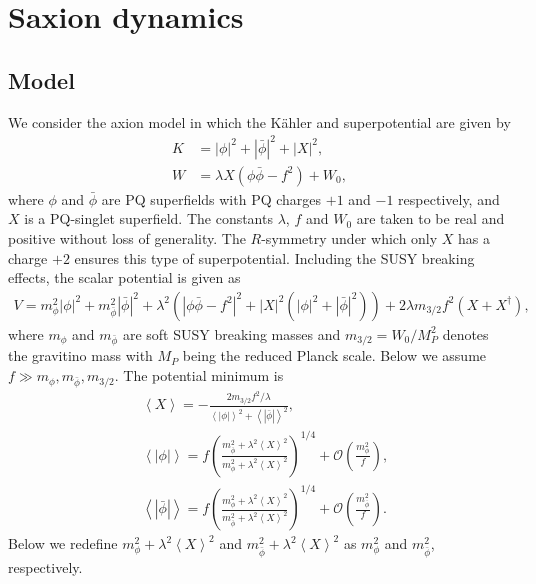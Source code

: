 \documentclass[12pt, a4paper]{article}
\begin{document}
\section{Saxion dynamics}
\label{sec:saxion}
\setcounter{equation}{0}


\subsection{Model}


We consider the axion model in which the K\"ahler and superpotential are given by
\begin{align}
	K &= |\phi|^2 + |\bar\phi|^2 +|X|^2,\\
	W& = \lambda X(\phi\bar\phi - f^2) + W_0,  \label{super}
\end{align}
where $\phi$ and $\bar\phi$ are PQ superfields with PQ charges $+1$ and $-1$ respectively, 
and $X$ is a PQ-singlet superfield.
The constants $\lambda$, $f$ and $W_0$ are taken to be real and positive without loss of generality.
The $R$-symmetry under which only $X$ has a charge $+2$ ensures this type of superpotential.
Including the SUSY breaking effects, the scalar potential is given as
\begin{align}
	V = m_\phi^2|\phi|^2 + m_{\bar\phi}^2|\bar\phi|^2 + \lambda^2\left(\left|\phi\bar\phi - f^2\right|^2+|X|^2(|\phi|^2+|\bar\phi|^2)\right) + 2\lambda m_{3/2}f^2(X+X^\dagger),
\end{align}
where $m_\phi$ and $m_{\bar\phi}$ are soft SUSY breaking masses and $m_{3/2} = W_0/M_P^2$ denotes the gravitino mass with 
$M_P$ being the reduced Planck scale.
Below we assume $f\gg m_\phi, m_{\bar\phi}, m_{3/2}$.
The potential minimum is
\begin{align}
	&\left<X\right> = -\frac{2m_{3/2}f^2/\lambda}{\left<|\phi|\right>^2+\left<|\bar\phi|\right>^2},\\
	&\left<|\phi|\right> = f \left( \frac{m_{\bar\phi}^2 + \lambda^2\left< X\right>^2}{m_{\phi}^2 + \lambda^2\left< X\right>^2}\right)^{1/4} 
	+ \mathcal O\left(\frac{m_\phi^2}{f}\right),\\
	&\left<|\bar\phi|\right> = f \left( \frac{m_{\phi}^2 + \lambda^2\left< X\right>^2}{m_{\bar\phi}^2 + \lambda^2\left< X\right>^2}\right)^{1/4}
	+ \mathcal O\left(\frac{m_{\bar\phi}^2}{f}\right).
\end{align}
Below we redefine $m_\phi^2 +  \lambda^2\left< X\right>^2$ and $m_{\bar\phi}^2 + \lambda^2\left< X\right>^2$
as $m_\phi^2$ and $m_{\bar\phi}^2$, respectively.
\end{document}
